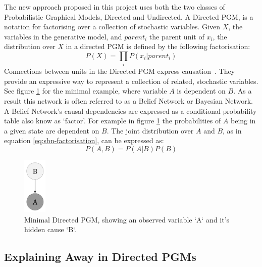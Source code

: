The new approach proposed in this project uses both the two classes of Probabilistic Graphical Models, Directed and Undirected. A Directed PGM, is a notation for factorising over a collection of stochastic variables.
Given $X$, the variables in the generative model, and $parent_i$ the parent unit of $x_i$, the distribution over $X$ in a directed PGM is defined by the following factorisation:
\begin{equation}\label{eq:sbn-factorisation}
P(X) = \prod_i P(x_i | parent_i)
\end{equation}
Connections between units in the Directed PGM express causation~\cite{Pearl:1988:PRI:52121}. They provide an expressive way to represent a collection of related, stochastic variables. See figure \ref{F:PGM-example} for the minimal example, where variable $A$ is dependent on $B$. As a result this network is often referred to as a Belief Network or Bayesian Network. A Belief Network's causal dependencies are expressed as a conditional probability table also know as `factor'. For example in figure \ref{F:PGM-example} the probabilities of $A$ being in a given state are dependent on $B$. The joint distribution over $A$ and $B$, as in equation \ref{eq:sbn-factorisation}, can be expressed as:
$$P(A,B) = P(A|B)P(B)$$
\begin{figure}
\begin{center}
  \includegraphics[width = 0.1\textwidth]{Assets/PGM_Example_1.png}
\caption{Minimal Directed PGM, showing an observed variable `A` and it's hidden cause `B`.}
\label{F:PGM-example}
\end{center}
\end{figure}

\subsection{Explaining Away in Directed PGMs}\label{S:Explaining-Away}

